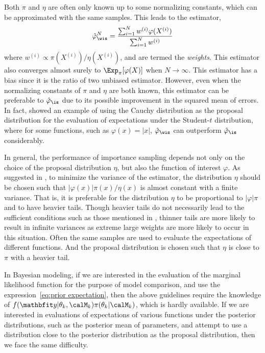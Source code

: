 Both $\pi$ and $\eta$ are often only known up to some normalizing constants,
which can be approximated with the same samples. This leads to the estimator,
\begin{equation}
  \hat\varphi_{\wis}^N
  = \frac{\sum_{i=1}^Nw^{(i)}\varphi(X^{(i)})}{\sum_{i=1}^Nw^{(i)}}
  \label{eq:is unnormalized}
\end{equation}
where $w^{(i)} \propto \pi(X^{(i)})/\eta(X^{(i)})$, and are termed the
\emph{weights}. This estimator also converges almost surely to
$\Exp_{\pi}[\varphi(X)]$ when $N\to\infty$. This estimator has a bias since it
is the ratio of two unbiased estimator. However, even when the normalizing
constants of $\pi$ and $\eta$ are both known, this estimator can be preferable
to $\hat\varphi_{\is}$ due to its possible improvement in the squared mean of
errors. In fact, \cite{Casella:1998tj} showed an example of using the Cauchy
distribution as the proposal distribution for the evaluation of expectations
under the Student-$t$ distribution, where for some functions, such as
$\varphi(x) = |x|$, $\hat\varphi_{\wis}$ can outperform $\hat\varphi_{\is}$
considerably.

In general, the performance of importance sampling depends not only on the
choice of the proposal distribution $\eta$, but also the function of interest
$\varphi$. As suggested in \cite[][sec.~3.3.2]{Robert:2004tn}, to minimize the
variance of the estimator, the distribution $\eta$ should be chosen such that
$|\varphi(x)|\pi(x)/\eta(x)$ is almost constant with a finite variance. That
is, it is preferable for the distribution $\eta$ to be proportional to
$|\varphi|\pi$ and to have heavier tails. Though heavier tails do not
necessarily lead to the sufficient conditions such as those mentioned in
\cite{Geweke:1989tm}, thinner tails are more likely to result in infinite
variances as extreme large weights are more likely to occur in this situation.
Often the same samples are used to evaluate the expectations of different
functions. And the proposal distribution is chosen such that $\eta$ is close
to $\pi$ with a heavier tail.

In Bayesian modeling, if we are interested in the evaluation of the marginal
likelihood function for the purpose of model comparison, and use the
expression~\ref{eq:prior expectation}, then the above guidelines require the
knowledge of $f(\data|\theta_k,\calM_k)\pi(\theta_k|\calM_k)$, which is hardly
available. If we are interested in evaluations of expectations of various
functions under the posterior distributions, such as the posterior mean of
parameters, and attempt to use a distribution close to the posterior
distribution as the proposal distribution, then we face the same difficulty.

